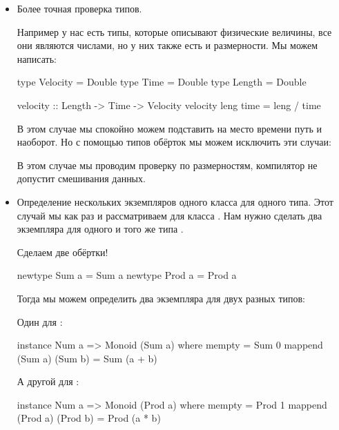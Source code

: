 \begin{itemize}
\item
  Более точная проверка типов.

  Например у нас есть типы, которые описывают физические величины, все
  они являются числами, но у них также есть и размерности. Мы можем
  написать:


  \begin{code}
  type Velocity   = Double
  type Time       = Double
  type Length     = Double

  velocity :: Length -> Time -> Velocity
  velocity leng time = leng / time
  \end{code}

  В этом случае мы спокойно можем подставить на место времени путь и
  наоборот. Но с помощью типов обёрток мы можем исключить эти случаи:



  В этом случае мы проводим проверку по размерностям, компилятор не
  допустит смешивания данных.
\item
  Определение нескольких экземпляров одного класса для одного типа. Этот
  случай мы как раз и рассматриваем для класса . Нам нужно
  сделать два экземпляра для одного и того же типа .

  Сделаем две обёртки!


  \begin{code}
  newtype Sum  a = Sum  a
  newtype Prod a = Prod a
  \end{code}

  Тогда мы можем определить два экземпляра для двух разных типов:

  Один для :


  \begin{code}
  instance Num a => Monoid (Sum a) where
      mempty  = Sum 0
      mappend (Sum a) (Sum b) = Sum (a + b)
  \end{code}

  А другой для :


  \begin{code}
  instance Num a => Monoid (Prod a) where
      mempty  = Prod 1
      mappend (Prod a) (Prod b) = Prod (a * b)
  \end{code}
\end{itemize}

